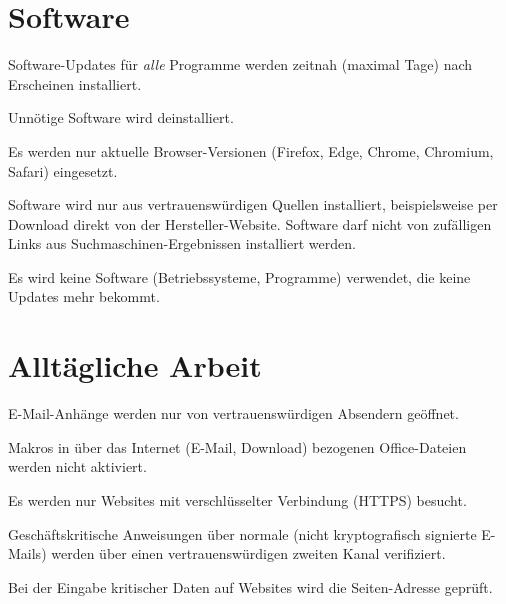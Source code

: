 \documentclass[10pt,a4paper]{article}
\begin{document}
\section{Software}
\begin{todolist}
\item{Software-Updates für \textit{alle} Programme werden zeitnah (maximal Tage) nach Erscheinen installiert.}
\item{Unnötige Software wird deinstalliert.}
\item{Es werden nur aktuelle Browser-Versionen (Firefox, Edge, Chrome, Chromium, Safari) eingesetzt.}
\item{Software wird nur aus vertrauenswürdigen Quellen installiert, beispielsweise per Download direkt von der Hersteller-Website. Software darf nicht von zufälligen Links aus Suchmaschinen-Ergebnissen installiert werden.}
\item{Es wird keine Software (Betriebssysteme, Programme) verwendet, die keine Updates mehr bekommt.}
\end{todolist}

\section{Alltägliche Arbeit}
\begin{todolist}
\item{E-Mail-Anhänge werden nur von vertrauenswürdigen Absendern geöffnet.}
\item{Makros in über das Internet (E-Mail, Download) bezogenen Office-Dateien werden nicht aktiviert.}
\item{Es werden nur Websites mit verschlüsselter Verbindung (HTTPS) besucht.}
\item{Geschäftskritische Anweisungen über normale (nicht kryptografisch signierte E-Mails) werden über einen vertrauenswürdigen zweiten Kanal verifiziert.}
\item{Bei der Eingabe kritischer Daten auf Websites wird die Seiten-Adresse geprüft.}
\end{todolist}
\end{document}
